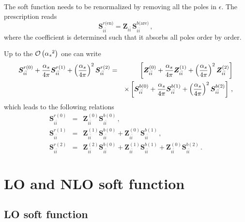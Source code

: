 \documentclass[a4paper,11pt]{report}
\numberwithin{equation}{section}
\newcommand{\bfS}{\bm{S}}
\newcommand{\bfZ}{\bm{Z}}
\begin{document}
The soft function needs to be renormalized by removing all the poles in
$\epsilon$. The prescription reads
%
\begin{equation}
  \bfS_{i\bar i}^{r\text{(en)}} = 
  \bfZ_{i\bar i}\, \bfS_{i\bar i}^{b\text{(are)}}\,, 
\end{equation}
%
where the coefficient is determined such that it absorbs all poles order by
order.

Up to the ${{\cal O}\left({\alpha_s}^2\right)}$ one can write
%
\begin{eqnarray}
  \bfS_{i\bar i}^{r (0)} + 
  \asp \bfS_{i\bar i}^{r (1)}  +
  \left(\asp \right)^2 \bfS_{i\bar i}^{r (2)} 
  & = &
  \left[\bfZ_{i\bar i}^{(0)} + \asp \bfZ_{i\bar i}^{(1)} +
  \left(\asp\right)^2 \bfZ_{i\bar i}^{(2)}
  \right]
  \\
  & &
  \times \left[
  \bfS_{i\bar i}^{b (0)} + 
  \asp \bfS_{i\bar i}^{b (1)}  +
  \left(\asp \right)^2 \bfS_{i\bar i}^{b (2)} 
  \right]\,,
  \nonumber
\end{eqnarray}
%
which leads to the following relations
%
\begin{eqnarray}
  \bfS_{i\bar i}^{r (0)}
  & = &
  \bfZ_{i\bar i}^{(0)} \bfS_{i\bar i}^{b (0)}\,,
  \\
  \label{eq:ren-id-1}
  \bfS_{i\bar i}^{r (1)}
  & = &
  \bfZ_{i\bar i}^{(1)} \bfS_{i\bar i}^{b (0)} +
  \bfZ_{i\bar i}^{(0)} \bfS_{i\bar i}^{b (1)}\,,
  \\
  \bfS_{i\bar i}^{r (2)}
  & = &
  \bfZ_{i\bar i}^{(2)} \bfS_{i\bar i}^{b (0)} +
  \bfZ_{i\bar i}^{(1)} \bfS_{i\bar i}^{b (1)} +
  \bfZ_{i\bar i}^{(0)} \bfS_{i\bar i}^{b (2)}\,.
\end{eqnarray}

\chapter{LO and NLO soft function}

\section{LO soft function}
\end{document}
